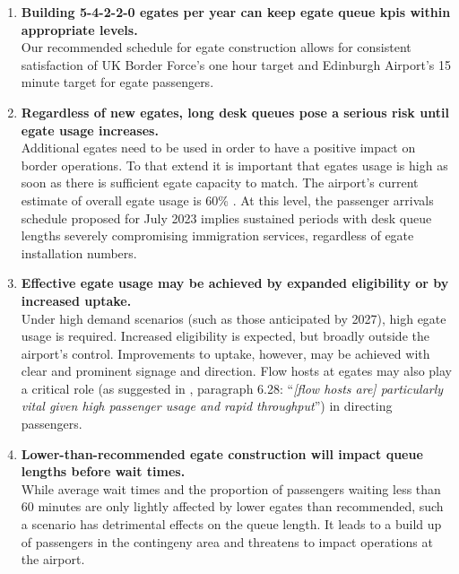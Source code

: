 \documentclass[10pt]{article}
\begin{document}
\begin{tcolorbox}[
colframe=edi-dark-purple,
colback=edi-light-purple,
fonttitle=\bfseries,
title = {Key Conclusions}]
\begin{enumerate}

    \item \textbf{Building 5-4-2-2-0 \glspl{egate} per year can keep \gls{egate} queue \glspl{kpi} within appropriate levels.}\\
    Our recommended schedule for \gls{egate} construction allows for consistent satisfaction of UK Border Force's one hour target and Edinburgh Airport's 15 minute target for \gls{egate} passengers.  \\ 
    \item \textbf{Regardless of new \glspl{egate}, long desk queues pose a serious risk until \gls{egate} usage increases.}\\
     Additional \glspl{egate} need to be used in order to have a positive impact on border operations. To that extend it is important that \glspl{egate} usage is high as soon as there is sufficient \gls{egate} capacity to match. The airport's current estimate of overall \gls{egate} usage is 60\% \cite{modelling_competition}. At this level, the passenger arrivals schedule proposed for July 2023 implies sustained periods with desk queue lengths severely compromising immigration services, regardless of \gls{egate} installation numbers.\\
    
    \item \textbf{Effective \gls{egate} usage may be achieved by expanded eligibility or by increased uptake.}\\
    Under high demand scenarios (such as those anticipated by 2027), high \gls{egate} usage is required. Increased eligibility is expected, but broadly outside the airport's control. Improvements to uptake, however, may be achieved with clear and prominent signage and direction. Flow hosts at \glspl{egate} may also play a critical role (as suggested in \cite{Inspection_eGates}, paragraph 6.28: ``\textit{[flow hosts are] particularly vital given high passenger usage and rapid throughput}'') in directing passengers.\\
    
    \item \textbf{Lower-than-recommended \gls{egate} construction will impact queue lengths before wait times.}\\
    While average wait times and the proportion of passengers waiting less than 60 minutes are only lightly affected by lower \glspl{egate} than recommended, such a scenario has detrimental effects on the queue length. It leads to a build up of passengers in the contingeny area and threatens to impact operations at the airport.
\end{enumerate}
\end{tcolorbox}
\end{document}
